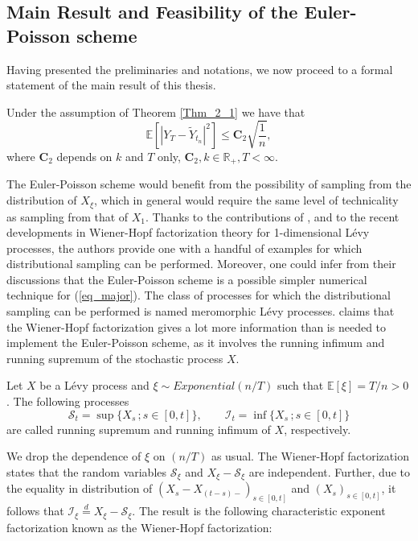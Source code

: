 \subsection{Main Result and Feasibility of the Euler-Poisson scheme}\label{Section2_3}
Having presented the preliminaries and notations, we now proceed to a formal statement of the main result of this thesis.
\begin{theorem}\label{main_result}
Under the assumption of Theorem \ref{Thm_2_1} we have that 
\begin{equation*}
    \mathbb{E} [|Y_{T} - \tilde{Y}_{t_{n}}|^2] \leq \mathbf{C}_2\sqrt{\dfrac{1}{n}},
\end{equation*}
where $\mathbf{C}_2 $ depends on $k$ and $ T$ only, $\mathbf{C}_2, k \in \mathbb{R}_+, T < \infty$.
\end{theorem}
The Euler-Poisson scheme would benefit from the possibility of sampling from the distribution of $X_{\xi}$, which in general would require the same level of technicality as sampling from that of $X_{1}$. Thanks to the contributions of ,   and  to the recent developments in Wiener-Hopf factorization theory for 1-dimensional L\'evy processes, the authors provide one with a handful of examples for which distributional sampling can be performed. Moreover, one could infer from their discussions that the Euler-Poisson scheme is a possible simpler numerical technique for (\ref{eq_major}). The class of processes for which the distributional sampling can be performed is named meromorphic L\'evy processes.  claims that the Wiener-Hopf factorization gives a lot more information than  is needed to implement the Euler-Poisson scheme, as it involves the running infimum and running supremum of the stochastic process $X$.
\begin{definition}
Let $X$ be a L\'evy process and $\xi \sim Exponential(n/T)$ such that $\mathbb{E}[ \xi]= T/n > 0$. The following processes
\begin{equation*}
  \mathcal{S}_t = \sup \{ X_s \,; s\in [0, t]\}, \qquad  \mathcal{I}_t = \inf \{ X_s \,; s\in [0, t]\}
\end{equation*}
are called running supremum and running infimum of $X$, respectively. 
\end{definition}
We drop the dependence of $\xi $ on $(n/T)$ as usual. The Wiener-Hopf factorization states that the random variables $\mathcal{S}_{\xi}$ and $X_{\xi} - \mathcal{S}_{\xi}$ are independent. Further, due to the equality in distribution of $(X_{s} - X_{(t-s)-})_{s\in [0, t]}$ and $(X_{s})_{s\in [0, t]}$, it follows that $\mathcal{I}_{\xi} \overset{d}{=} X_{\xi} - \mathcal{S}_{\xi} $. The result is the following  characteristic exponent factorization known as the Wiener-Hopf factorization:
